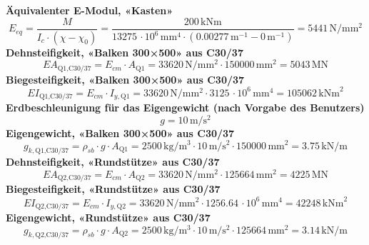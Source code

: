 \documentclass[11pt,a4paper]{article}
\begin{document}
\noindent\textbf{Äquivalenter E-Modul, «Kasten»}
\begin{equation*}
E_{eq} = \frac{M}{I_c \cdot \left(\chi - \chi_0\right)} = \frac{200\,\mathrm{kNm}}{13275\,\cdot 10^{6}\,\mathrm{mm}^{4} \cdot \left(0.00277\,\mathrm{m}^{-1} - 0\,\mathrm{m}^{-1}\right)} = 5441\,\mathrm{N}/\mathrm{mm}^{2}
\end{equation*}
\noindent\textbf{Dehnsteifigkeit, «Balken 300×500» aus C30/37}
\begin{equation*}
EA_{\text{Q1,C30/37}} = E_{cm} \cdot A_{\text{Q1}} = 33620\,\mathrm{N}/\mathrm{mm}^{2} \cdot 150000\,\mathrm{mm}^{2} = 5043\,\mathrm{MN}
\end{equation*}
\noindent\textbf{Biegesteifigkeit, «Balken 300×500» aus C30/37}
\begin{equation*}
EI_{\text{Q1,C30/37}} = E_{cm} \cdot I_{y,\text{Q1}} = 33620\,\mathrm{N}/\mathrm{mm}^{2} \cdot 3125\,\cdot 10^{6}\,\mathrm{mm}^{4} = 105062\,\mathrm{kNm}^{2}
\end{equation*}
\noindent\textbf{Erdbeschleunigung für das Eigengewicht (nach Vorgabe des Benutzers)}
\begin{equation*}
g = 10\,\mathrm{m}/\mathrm{s}^{2}
\end{equation*}
\noindent\textbf{Eigengewicht, «Balken 300×500» aus C30/37}
\begin{equation*}
g_{k,\text{Q1,C30/37}} = \rho_{sb} \cdot g \cdot A_{\text{Q1}} = 2500\,\mathrm{kg}/\mathrm{m}^{3} \cdot 10\,\mathrm{m}/\mathrm{s}^{2} \cdot 150000\,\mathrm{mm}^{2} = 3.75\,\mathrm{kN}/\mathrm{m}
\end{equation*}
\noindent\textbf{Dehnsteifigkeit, «Rundstütze» aus C30/37}
\begin{equation*}
EA_{\text{Q2,C30/37}} = E_{cm} \cdot A_{\text{Q2}} = 33620\,\mathrm{N}/\mathrm{mm}^{2} \cdot 125664\,\mathrm{mm}^{2} = 4225\,\mathrm{MN}
\end{equation*}
\noindent\textbf{Biegesteifigkeit, «Rundstütze» aus C30/37}
\begin{equation*}
EI_{\text{Q2,C30/37}} = E_{cm} \cdot I_{y,\text{Q2}} = 33620\,\mathrm{N}/\mathrm{mm}^{2} \cdot 1256.64\,\cdot 10^{6}\,\mathrm{mm}^{4} = 42248\,\mathrm{kNm}^{2}
\end{equation*}
\noindent\textbf{Eigengewicht, «Rundstütze» aus C30/37}
\begin{equation*}
g_{k,\text{Q2,C30/37}} = \rho_{sb} \cdot g \cdot A_{\text{Q2}} = 2500\,\mathrm{kg}/\mathrm{m}^{3} \cdot 10\,\mathrm{m}/\mathrm{s}^{2} \cdot 125664\,\mathrm{mm}^{2} = 3.14\,\mathrm{kN}/\mathrm{m}
\end{equation*}
\end{document}
